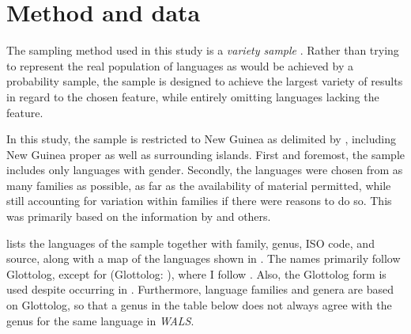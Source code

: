 \documentclass[output=collectionpaper]{langsci/langscibook}
\begin{document}
\section{Method and data}
\label{sec:Svard:2}

The sampling method used in this study is a \textit{variety sample} \citep{Bakker2012}. Rather than trying to represent the real population of languages as would be achieved by a probability sample, the sample is designed to achieve the largest variety of results in regard to the chosen feature, while entirely omitting languages lacking the feature.


In this study, the sample is restricted to New Guinea as delimited by \citet[357]{Foley2000}, including New Guinea proper as well as surrounding islands. First and foremost, the sample includes only languages with gender. Secondly, the languages were chosen from as many families as possible, as far as the availability of material permitted, while still accounting for variation within families if there were reasons to do so. This was primarily based on the information by \citet{Foley2000} and others.



 lists the languages of the sample together with family, genus, ISO code, and source, along with a map of the languages shown in . The names primarily follow Glottolog, except for  (Glottolog: ), where I follow \citet{Onishi1994}. Also, the Glottolog form  is used despite  occurring in \citet{Corris2005}. Furthermore, language families and genera are based on Glottolog, so that a genus in the table below does not always agree with the genus for the same language in \textit{WALS}.
\end{document}
